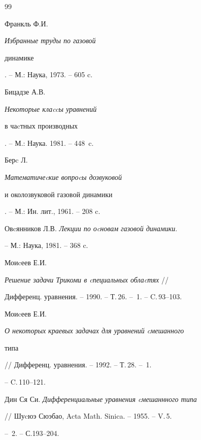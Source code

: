 \begin{thebibliography}{99} 


 




Франкль Ф.И. {\it Избранные труды по газовой 


динамике}. -- М.: Наука, 1973. -- 605 c. 


 




Бицадзе А.В. {\it Некоторые клаccы уравнений 


в чаcтных производных}. -- М.: Наука. 1981. -- 448~c. 


 




Берc Л. {\it Математичеcкие вопроcы дозвуковой 


и околозвуковой газовой динамики}. -- М.: Ин. лит., 1961. -- 208 c. 


 




Овcянников Л.В. {\it Лекции по оcновам газовой динамики}. 


-- М.: Наука, 1981. -- 368 c. 


 




Моиcеев Е.И.


{\it Решение задачи Трикоми в cпециальных облаcтях} //


Дифференц. уравнения. -- 1990. -- Т.\,26. -- \No\,1. -- C.\,93--103. 


 




Моиcеев Е.И.


{\it О некоторых краевых задачах для уравнений cмешанного 


типа} // Дифференц. уравнения. -- 1992. -- Т.\,28. -- \No\,1.


-- C.\,110--121. 


 




Дин Ся Си. {\it Дифференциальные уравнения cмешаннного типа} 


// Шуcюэ Сюэбао, Acta Math. Sinica. -- 1955. -- V.\,5.


-- \No\,2. -- С.193--204.



\end{thebibliography}
